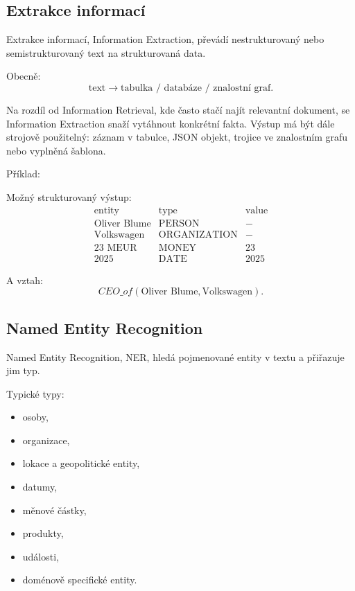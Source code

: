 \subsection{Extrakce informací}

Extrakce informací, Information Extraction, převádí nestrukturovaný nebo semistrukturovaný text na
strukturovaná data.

Obecně:
\[
\text{text}
\rightarrow
\text{tabulka / databáze / znalostní graf}.
\]

Na rozdíl od Information Retrieval, kde často stačí najít relevantní dokument, se Information Extraction snaží
vytáhnout konkrétní fakta. Výstup má být dále strojově použitelný: záznam v tabulce, JSON objekt, trojice ve
znalostním grafu nebo vyplněná šablona.

Příklad:
\begin{quote}
\end{quote}

Možný strukturovaný výstup:
\[
\begin{array}{lll}
\text{entity} & \text{type} & \text{value}\\
\hline
\text{Oliver Blume} & \text{PERSON} & -\\
\text{Volkswagen} & \text{ORGANIZATION} & -\\
\text{23 MEUR} & \text{MONEY} & 23\\
\text{2025} & \text{DATE} & 2025
\end{array}
\]

A vztah:
\[
CEO\_of(\text{Oliver Blume},\text{Volkswagen}).
\]

\subsection{Named Entity Recognition}

Named Entity Recognition, NER, hledá pojmenované entity v textu a přiřazuje jim typ.

Typické typy:
\begin{itemize}
    \item osoby,
    \item organizace,
    \item lokace a geopolitické entity,
    \item datumy,
    \item měnové částky,
    \item produkty,
    \item události,
    \item doménově specifické entity.
\end{itemize}

